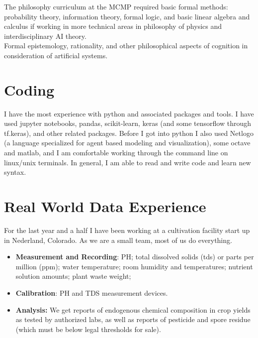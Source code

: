 \documentclass[11pt, oneside]{article}   	%
\begin{document}
\noindent The philosophy curriculum at the MCMP required basic formal methods: probability theory, information theory, formal logic, and basic linear algebra and calculus if working in more technical areas in philosophy of physics and interdisciplinary AI theory.  \\

\noindent Formal epistemology, rationality, and other philosophical aspects of cognition in consideration of artificial systems. \\




\section{Coding}

I have the most experience with python and associated packages and tools.  I have used jupyter notebooks, pandas, scikit-learn, keras (and some tensorflow through tf.keras), and other related packages.  Before I got into python I also used Netlogo (a language specialized for agent based modeling and visualization), some octave and matlab, and I am comfortable working through the command line on linux/unix terminals.  In general, I am able to read and write code and learn new syntax.  

\section{Real World Data Experience}

For the last year and a half I have been working at a cultivation facility start up in Nederland, Colorado.  As we are a small team, most of us do everything.

\begin{multicols}{2}
\begin{itemize}
    \item \textbf{Measurement and Recording}: PH; total dissolved solids (tds) or parts per million (ppm); water temperature; room humidity and temperatures; nutrient solution amounts; plant waste weight; 
    \item \textbf{Calibration}: PH and TDS measurement devices.
    \item \textbf{Analysis:} We get reports of endogenous chemical composition in crop yields as tested by authorized labs, as well as reports of pesticide and spore residue (which must be below legal thresholds for sale).
\end{itemize}
\end{multicols}
\end{document}
